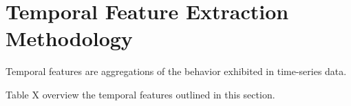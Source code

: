 \section{Temporal Feature Extraction Methodology}
\label{sec:featureextraction}

Temporal features are aggregations of the behavior exhibited in time-series data.

Table X overview the temporal features outlined in this section.

